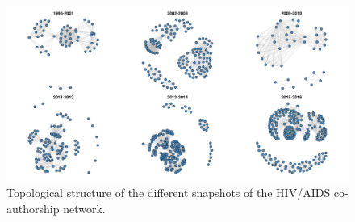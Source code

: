 \begin{figure}[!ht]
\hspace{-1.25cm}
\includegraphics[scale=0.4]{Chapters/hiv/statMod/hiv_dynNetwork}
\caption{Topological structure of the different snapshots of the HIV/AIDS co-authorship network.}
\label{fig:hiv_dynNetwork}
\end{figure}

